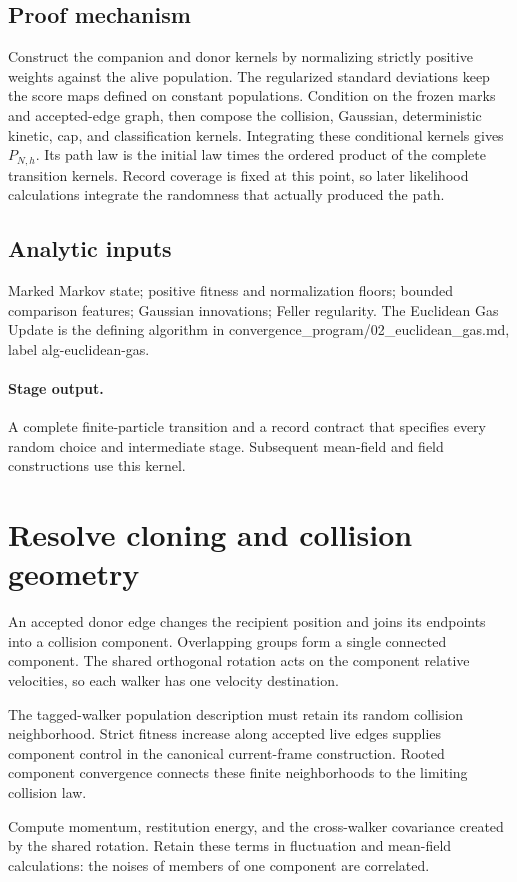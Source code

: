 \documentclass[11pt,a4paper]{article}
\begin{document}
\subsection*{Proof mechanism}
Construct the companion and donor kernels by normalizing strictly positive weights against the alive population. The regularized standard deviations keep the score maps defined on constant populations. Condition on the frozen marks and accepted-edge graph, then compose the collision, Gaussian, deterministic kinetic, cap, and classification kernels. Integrating these conditional kernels gives \(P_{N,h}\). Its path law is the initial law times the ordered product of the complete transition kernels. Record coverage is fixed at this point, so later likelihood calculations integrate the randomness that actually produced the path.
\subsection*{Analytic inputs}
Marked Markov state; positive fitness and normalization floors; bounded comparison features; Gaussian innovations; Feller regularity. The Euclidean Gas Update is the defining algorithm in convergence\_program/02\_euclidean\_gas.md, label alg-euclidean-gas.
\paragraph{Stage output.} A complete finite-particle transition and a record contract that specifies every random choice and intermediate stage. Subsequent mean-field and field constructions use this kernel.

\section{Resolve cloning and collision geometry}
\label{stage:2}
An accepted donor edge changes the recipient position and joins its endpoints into a collision component. Overlapping groups form a single connected component. The shared orthogonal rotation acts on the component relative velocities, so each walker has one velocity destination.

The tagged-walker population description must retain its random collision neighborhood. Strict fitness increase along accepted live edges supplies component control in the canonical current-frame construction. Rooted component convergence connects these finite neighborhoods to the limiting collision law.

Compute momentum, restitution energy, and the cross-walker covariance created by the shared rotation. Retain these terms in fluctuation and mean-field calculations: the noises of members of one component are correlated.
\end{document}
